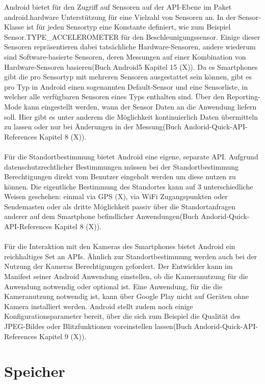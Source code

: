 Android bietet für den Zugriff auf Sensoren auf der API-Ebene im Paket android.hardware Unterstützung für eine Vielzahl von Sensoren an. In der Sensor-Klasse ist für jeden Sensortyp eine Konstante definiert, wie zum Beispiel \\ Sensor.TYPE\_ACCELEROMETER für den Beschleunigungssensor. Einige dieser Sensoren repräsentieren dabei tatsächliche Hardware-Sensoren, andere wiederum sind Software-basierte Sensoren, deren Messungen auf einer Kombination von Hardware-Sensoren basieren(Buch Android5 Kapitel 15 (X)). Da es Smartphones gibt die pro Sensortyp mit mehreren Sensoren ausgestattet sein können, gibt es pro Typ in Android einen sogenannten Default-Sensor und eine Sensorliste, in welcher alle verfügbaren Sensoren eines Typs enthalten sind. Über den Reporting-Mode kann eingestellt werden, wann der Sensor Daten an die Anwendung liefern soll. Hier gibt es unter anderem die Möglichkeit kontinuierlich Daten übermitteln zu lassen oder nur bei Änderungen in der Messung(Buch Andorid-Quick-API-References Kapitel 8 (X)). 
\\
\\
Für die Standortbestimmung bietet Android eine eigene, separate API. Aufgrund datenschutzrechtlicher Bestimmungen müssen bei der Standortbestimmung Berechtigungen direkt vom Benutzer eingeholt werden um diese nutzen zu können. Die eigentliche Bestimmung des Standortes kann auf 3 unterschiedliche Weisen geschehen: einmal via GPS (X), via WiFi Zugangspunkten oder Sendemasten oder als dritte Möglichkeit passiv über die Standortanfragen anderer auf dem Smartphone befindlicher Anwendungen(Buch Andorid-Quick-API-References Kapitel 8 (X)). 
\\
\\
Für die Interaktion mit den Kameras des Smartphones bietet Android ein reichhaltiges Set an APIs. Ähnlich zur Standortbestimmung werden auch bei der Nutzung der Kameras Berechtigungen gefordert. Der Entwickler kann im Manifest seiner Android Anwendung einstellen, ob die Kameranutzung für die Anwendung notwendig oder optional ist. Eine Anwendung, für die die Kameranutzung notwendig ist, kann über Google Play nicht auf Geräten ohne Kamera installiert werden. Android stellt zudem noch einige Konfigurationsparameter bereit, über die sich zum Beispiel die Qualität des JPEG-Bildes oder Blitzfunktionen voreinstellen lassen(Buch Andorid-Quick-API-References Kapitel 9 (X)). 

\section{Speicher}

